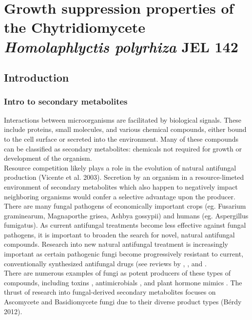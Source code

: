 ﻿%
\chapter{Growth suppression properties of the Chytridiomycete \textit{Homolaphlyctis polyrhiza} JEL 142}
\label{chap:Hp_inhibition}
\section{Introduction}
\subsection{Intro to secondary metabolites}
Interactions between microorganisms are facilitated by biological signals. These include proteins, small molecules, and various chemical compounds, either bound to the cell surface or secreted into the environment. Many of these compounds can be classified as secondary metabolites: chemicals not required for growth or development of the organism. \\
\indent Resource competition likely plays a role in the evolution of natural antifungal production (Vicente et al. 2003). Secretion by an organism in a resource-limeted environment of secondary metabolites which also happen to negatively impact neighboring organisms would confer a selective advantage upon the producer.\\
\indent There are many fungal pathogens of economically important crops (eg. Fusarium graminearum, Magnaporthe grisea, Ashbya gossypii) and humans (eg. Aspergillus fumigatus). As current antifungal treatments become less effective against fungal pathogens, it is important to broaden the search for novel, natural antifungal compounds. Research into new natural antifungal treatment is increasingly important as certain pathogenic fungi become progressively resistant to current, conventionally synthesized antifungal drugs (see reviews by \cite{Bossche1998}, \cite{Kontoyiannis2002}, and \cite{Pfaller2012}. \\
\indent There are numerous examples of fungi as potent producers of these types of compounds, including toxins \cite{Kokkonen2010}, antimicrobials \cite{Wiemann2014}, and plant hormone mimics \cite{Howlett 2006}. The thrust of research into fungal-derived secondary metabolites focuses on Ascomycete and Basidiomycete fungi due to their diverse product types (Bérdy 2012). \\
